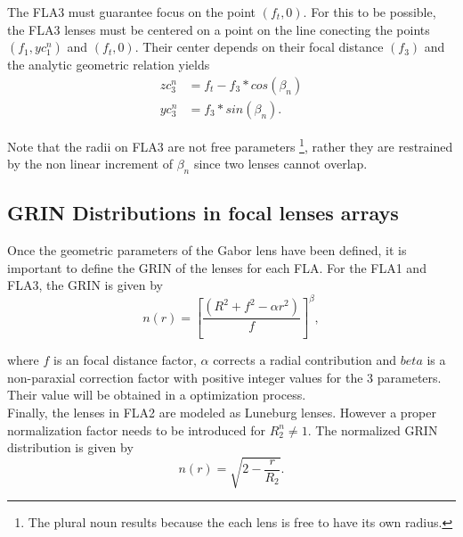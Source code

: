 The FLA3 must guarantee focus on the point $(f_t,0)$. For this to be possible, the FLA3 lenses must be centered on a point on the line conecting the points $(f_1,yc_1^n)$ and $(f_t,0)$. Their center depends on their focal distance $(f_3)$ and the analytic geometric relation yields
\begin{equation}
\begin{split}
    zc_3^n &= f_t - f_3*cos(\beta_n) \\
    yc_3^n &= f_3*sin(\beta_n). 
    \end{split}
\end{equation}

Note that the radii on FLA3 are not free parameters \footnote{The plural noun results because the each lens is free to have its own radius.}, rather they are restrained by the non linear increment of $\beta_n$ since two lenses cannot overlap. 

\subsection{GRIN Distributions in focal lenses arrays}
Once the geometric parameters of the Gabor lens have been defined, it is important to define the GRIN of the lenses for each FLA. For the FLA1 and FLA3, the GRIN is given by 
\begin{equation}
    n(r) = \left[\frac{(R^2+f^2-\alpha r^2)}{f}\right]^\beta,
\end{equation}

where $f$ is an focal distance factor, $\alpha$ corrects a radial contribution and $beta$ is a non-paraxial correction factor with positive integer values for the 3 parameters. Their value will be obtained in a optimization process. \\

Finally, the lenses in FLA2 are modeled as Luneburg lenses. However a proper normalization factor needs to be introduced for $R_2^n \neq 1$. The normalized GRIN distribution is given by
\begin{equation}
    n(r) = \sqrt{2-\frac{r}{R_2}}.
\end{equation}

